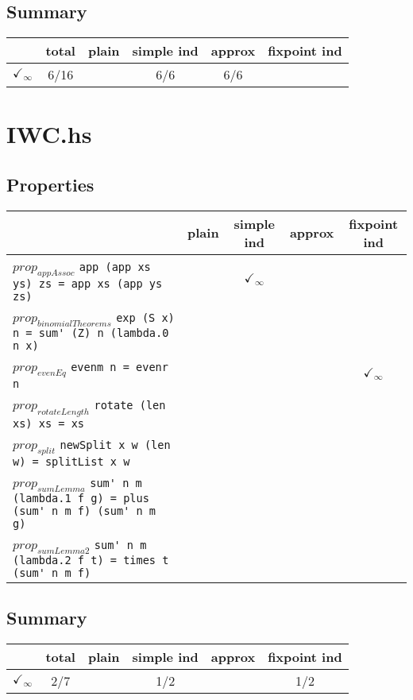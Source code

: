 \documentclass{article}
\begin{document}
\subsection*{Summary}
\begin{longtable}{p{4cm} || c | c | c | c | c | }
  & total & plain & simple ind & approx & fixpoint ind \\
\hline
$\checkmark_{\infty}$ & 6/16 &  & 6/6 & 6/6 & \\
\end{longtable}

\section*{IWC.hs}
\subsection*{Properties}
\begin{longtable}{p{10cm} || c | c | c | c | }
  & plain & simple ind & approx & fixpoint ind \\
\hline
$prop_{appAssoc}$ \newline \verb`app (app xs ys) zs = app xs (app ys zs)` &  & $\checkmark_{\infty}$ &  &  \\
\hline
$prop_{binomialTheorems}$ \newline \verb`exp (S x) n = sum' (Z) n (lambda.0 n x)` &  &  &  &  \\
\hline
$prop_{evenEq}$ \newline \verb`evenm n = evenr n` &  &  &  & $\checkmark_{\infty}$ \\
\hline
$prop_{rotateLength}$ \newline \verb`rotate (len xs) xs = xs` &  &  &  &  \\
\hline
$prop_{split}$ \newline \verb`newSplit x w (len w) = splitList x w` &  &  &  &  \\
\hline
$prop_{sumLemma}$ \newline \verb`sum' n m (lambda.1 f g) = plus (sum' n m f) (sum' n m g)` &  &  &  &  \\
\hline
$prop_{sumLemma2}$ \newline \verb`sum' n m (lambda.2 f t) = times t (sum' n m f)` &  &  &  &  \\
\end{longtable}

\subsection*{Summary}
\begin{longtable}{p{4cm} || c | c | c | c | c | }
  & total & plain & simple ind & approx & fixpoint ind \\
\hline
$\checkmark_{\infty}$ & 2/7 &  & 1/2 &  & 1/2\\
\end{longtable}
\end{document}
